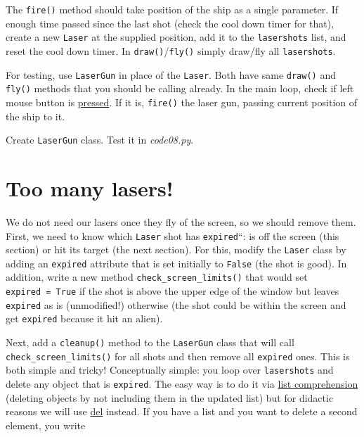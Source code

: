 \documentclass[
]{book}
\begin{document}
The \texttt{fire()} method should take position of the ship as a single parameter. If enough time passed since the last shot (check the cool down timer for that), create a new \texttt{Laser} at the supplied position, add it to the \texttt{lasershots} list, and reset the cool down timer. In \texttt{draw()}/\texttt{fly()} simply draw/fly all \texttt{lasershots}.

For testing, use \texttt{LaserGun} in place of the \texttt{Laser}. Both have same \texttt{draw()} and \texttt{fly()} methods that you should be calling already. In the main loop, check if left mouse button is \href{https://psychopy.org/api/event.html\#psychopy.event.Mouse.getPressed}{pressed}. If it is, \texttt{fire()} the laser gun, passing current position of the ship to it.

Create \texttt{LaserGun} class.
Test it in \emph{code08.py}.

\hypertarget{too-many-lasers}{%
\section{Too many lasers!}\label{too-many-lasers}}

We do not need our lasers once they fly of the screen, so we should remove them. First, we need to know which \texttt{Laser} shot has \texttt{expired}``: is off the screen (this section) or hit its target (the next section). For this, modify the \texttt{Laser} class by adding an \texttt{expired} attribute that is set initially to \texttt{False} (the shot is good). In addition, write a new method \texttt{check\_screen\_limits()} that would set \texttt{expired\ =\ True} if the shot is above the upper edge of the window but leaves \texttt{expired} as is (unmodified!) otherwise (the shot could be within the screen and get \texttt{expired} because it hit an alien).

Next, add a \texttt{cleanup()} method to the \texttt{LaserGun} class that will call \texttt{check\_screen\_limits()} for all shots and then remove all \texttt{expired} ones. This is both simple and tricky! Conceptually simple: you loop over \texttt{lasershots} and delete any object that is \texttt{expired}. The easy way is to do it via \protect\hyperlink{list-comprehension}{list comprehension} (deleting objects by not including them in the updated list) but for didactic reasons we will use \href{https://docs.python.org/3/tutorial/datastructures.html\#the-del-statement}{del} instead. If you have a list and you want to delete a second element, you write
\end{document}
